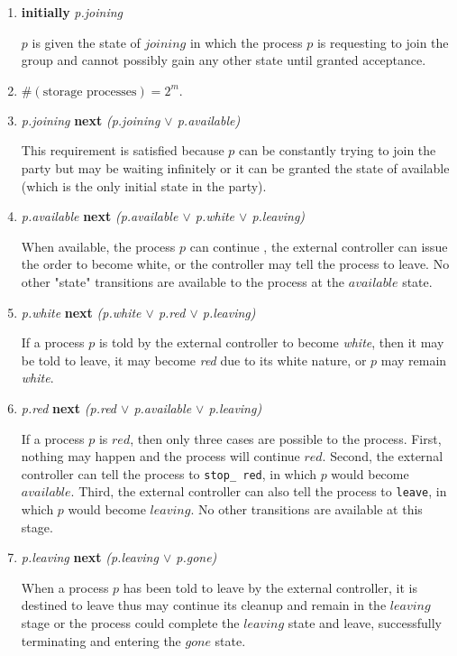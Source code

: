 \documentclass[11pt]{article}
\begin{document}
\begin{enumerate}[S1]
\item {\bfseries initially} {\it p.joining}

$p$ is given the state of $joining$ in which the process $p$ is requesting to join the group and cannot possibly gain any other state until granted acceptance.


\item $\#(\text{storage processes}) = 2^m.$

\item {\it p.joining} {\bfseries next} {\it (p.joining $\vee$ p.available)}

This requirement is satisfied because $p$ can be constantly trying to join the party but may be waiting infinitely or it can be granted the state of available (which is the only initial state in the party).

\item {\it p.available} {\bfseries next} {\it (p.available $\vee$ p.white $\vee$ p.leaving)}

When available, the process $p$ can continue \available, the external controller can issue the order to become white, or the controller may tell the process to leave. No other "state" transitions are available to the process at the $available$ state. 

\item {\it p.white} {\bfseries next} {\it (p.white $\vee$ p.red $\vee$ p.leaving)}

If a process $p$ is told by the external controller to become \emph{white}, then it may be told to leave, it may become \emph{red} due to its white nature, or $p$ may remain \emph{white}. 

\item {\it p.red} {\bfseries next} {\it (p.red $\vee$ p.available $\vee$ p.leaving)}

If a process $p$ is $red$, then only three cases are possible to the process. First, nothing may happen and the process will continue $red$. Second, the external controller can tell the process to \texttt{stop\_ red}, in which $p$ would become $available$. Third, the external controller can also tell the process to \texttt{leave}, in which $p$ would become $leaving$. No other transitions are available at this stage.

\item {\it p.leaving} {\bfseries next} {\it (p.leaving $\vee$ p.gone)}

When a process $p$ has been told to leave by the external controller, it is destined to leave thus may continue its cleanup and remain in the $leaving$ stage or the process could complete the $leaving$ state and leave, successfully terminating and entering the $gone$ state.


\end{enumerate}
\end{document}
